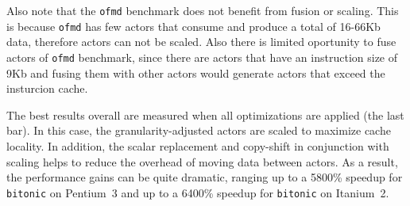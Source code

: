 Also note that the \texttt{ofmd} benchmark does not benefit from fusion or
scaling. This is because  \texttt{ofmd} has few actors that consume 
and produce a total of 16-66Kb data, therefore actors can not be scaled.
Also there is limited oportunity to fuse actors of \texttt{ofmd} 
benchmark, since there are actors that have an instruction size of 9Kb 
and fusing them with other actors would generate actors that exceed the
insturcion cache.


The best results overall are measured when all optimizations are
applied (the last bar). In this case, the granularity-adjusted actors
are scaled to maximize cache locality. In addition, the scalar replacement
and copy-shift in conjunction with scaling helps to reduce the overhead of 
moving data between actors. As a result, the performance gains can be quite
dramatic, ranging up to a 5800\% speedup for \texttt{bitonic} on Pentium~3
and up to a 6400\% speedup for \texttt{bitonic} on Itanium~2.



